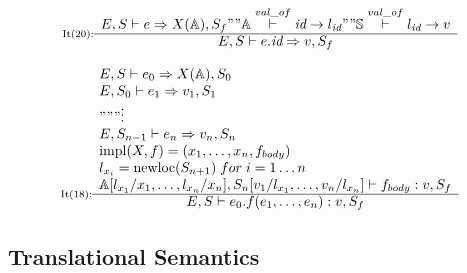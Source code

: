{\[
\inference[It(20):]{
E,S|-e=>X(\mathbb{A}),S_f "" \mathbb{A} \overset{val\_of}{|-} \textit{id} -> l_{\textit{id}} "" \mathbb{S} \overset{val\_of}{|-} l_{\textit{id}} -> v
}
{E,S|-e.\textit{id}=>v,S_f}
\]

\[
\inference[It(18):]{
E,S|-e_0=>X(\mathbb{A}),S_0 \\
E,S_0|-e_1=>v_1,S_1 \\
""" \vdots \\
E,S_{n-1}|-e_n=>v_n,S_n \\
\operatorname{impl}(X,f) = (x_1, \dots, x_n, f_{body}) \\
l_{x_i} = \operatorname{newloc}(S_{n+1}) \; for \; i = 1 \dots n \\
\mathbb{A}[l_{x_1}/x_1, \dots, l_{x_n}/x_n],S_n[v_1/l_{x_1}, \dots, v_n/l_{x_n}]|-f_{body}:v,S_f
}
{E,S|-e_0.f(e_1, \dots, e_n):v,S_f}
\]


%
}



\mathligsoff

\subsection{Translational Semantics}\label{sec:translational-semantic}

